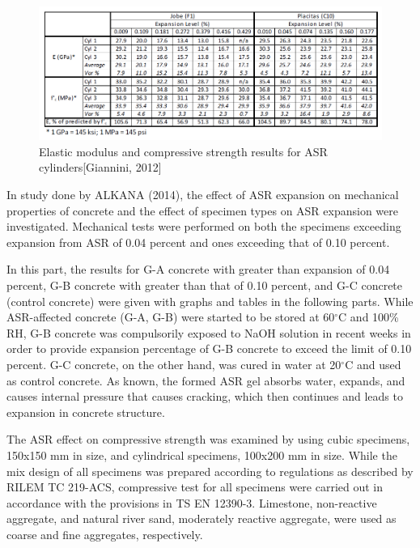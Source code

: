 \begin{figure}[h!]
  \centering
  \includegraphics[width=0.8\linewidth]{Reference/GIANNINIASR.png}
  \caption{Elastic modulus and compressive strength results for ASR cylinders[Giannini, 2012]}
  \label{Giannini, 2012}
\end{figure}

\clearpage

In study done by ALKANA (2014)\cite{ALKANA}, the effect of ASR expansion on mechanical properties of concrete and the effect of specimen types on ASR expansion were investigated. Mechanical tests were performed on both the specimens exceeding expansion from ASR of 0.04 percent and ones exceeding that of 0.10 percent.

In this part, the results for G-A concrete with greater than expansion of 0.04 percent, G-B concrete with greater than that of 0.10 percent, and G-C concrete (control concrete) were given with graphs and tables in the following parts. While ASR-affected concrete (G-A, G-B) were started to be stored at 60$^\circ$C and 100\% RH, G-B concrete was compulsorily exposed to NaOH solution in recent weeks in order to provide expansion percentage of G-B concrete to exceed the limit of 0.10 percent. G-C concrete, on the other hand, was cured in water at 20$^\circ$C and used as control concrete. As known, the formed ASR gel absorbs water, expands, and causes internal pressure that causes cracking, which then continues and leads to expansion in concrete structure.



The ASR effect on compressive strength was examined by using cubic specimens, 150x150 mm in size, and cylindrical specimens, 100x200 mm in size. While the mix design of all specimens was prepared according to regulations as described by RILEM TC 219-ACS, compressive test for all specimens were carried out in accordance with the provisions in TS EN 12390-3. Limestone, non-reactive aggregate, and natural river sand, moderately reactive aggregate, were used as coarse and fine aggregates, respectively.

